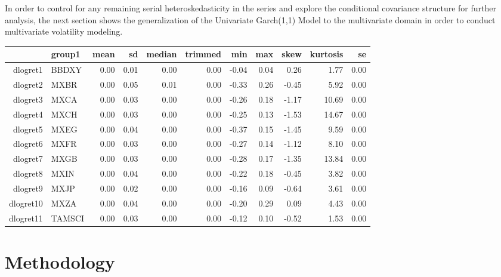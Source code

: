 \documentclass[11pt,preprint, authoryear]{elsarticle}
\let\origtable\table
\let\endorigtable\endtable
\renewenvironment{table}[1][2] {
    \expandafter\origtable\expandafter[H]
} {
    \endorigtable
}
\numberwithin{equation}{section}
\numberwithin{figure}{section}
\numberwithin{table}{section}
\begin{document}
In order to control for any remaining serial heteroskedasticity in the
series and explore the conditional covariance structure for further
analysis, the next section shows the generalization of the Univariate
Garch(1,1) Model to the multivariate domain in order to conduct
multivariate volatility modeling. \hfill

\begin{table}[H]
\centering
\begin{tabular}{rlrrrrrrrrr}
  \hline
 & group1 & mean & sd & median & trimmed & min & max & skew & kurtosis & se \\ 
  \hline
dlogret1 & BBDXY & 0.00 & 0.01 & 0.00 & 0.00 & -0.04 & 0.04 & 0.26 & 1.77 & 0.00 \\ 
  dlogret2 & MXBR & 0.00 & 0.05 & 0.01 & 0.00 & -0.33 & 0.26 & -0.45 & 5.92 & 0.00 \\ 
  dlogret3 & MXCA & 0.00 & 0.03 & 0.00 & 0.00 & -0.26 & 0.18 & -1.17 & 10.69 & 0.00 \\ 
  dlogret4 & MXCH & 0.00 & 0.03 & 0.00 & 0.00 & -0.25 & 0.13 & -1.53 & 14.67 & 0.00 \\ 
  dlogret5 & MXEG & 0.00 & 0.04 & 0.00 & 0.00 & -0.37 & 0.15 & -1.45 & 9.59 & 0.00 \\ 
  dlogret6 & MXFR & 0.00 & 0.03 & 0.00 & 0.00 & -0.27 & 0.14 & -1.12 & 8.10 & 0.00 \\ 
  dlogret7 & MXGB & 0.00 & 0.03 & 0.00 & 0.00 & -0.28 & 0.17 & -1.35 & 13.84 & 0.00 \\ 
  dlogret8 & MXIN & 0.00 & 0.04 & 0.00 & 0.00 & -0.22 & 0.18 & -0.45 & 3.82 & 0.00 \\ 
  dlogret9 & MXJP & 0.00 & 0.02 & 0.00 & 0.00 & -0.16 & 0.09 & -0.64 & 3.61 & 0.00 \\ 
  dlogret10 & MXZA & 0.00 & 0.04 & 0.00 & 0.00 & -0.20 & 0.29 & 0.09 & 4.43 & 0.00 \\ 
  dlogret11 & TAMSCI & 0.00 & 0.03 & 0.00 & 0.00 & -0.12 & 0.10 & -0.52 & 1.53 & 0.00 \\ 
   \hline
\end{tabular}
\caption{Descriptive Statistics Table \label{tab2}} 
\end{table}

\hypertarget{methodology}{%
\section{\texorpdfstring{Methodology
\label{Meth}}{Methodology }}\label{methodology}}
\end{document}
